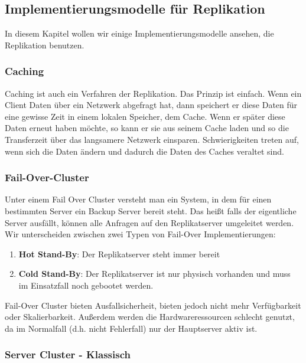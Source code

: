\subsection{Implementierungsmodelle für Replikation}
In diesem Kapitel wollen wir einige Implementierungsmodelle ansehen, die Replikation benutzen.

\subsubsection{Caching}
Caching ist auch ein Verfahren der Replikation. Das Prinzip ist einfach. Wenn ein Client Daten über ein Netzwerk abgefragt hat, dann speichert er diese Daten für eine gewisse Zeit in einem lokalen Speicher, dem Cache. Wenn er später diese Daten erneut haben möchte, so kann er sie aus seinem Cache laden und so die Transferzeit über das langsamere Netzwerk einsparen. Schwierigkeiten treten auf, wenn sich die Daten ändern und dadurch die Daten des Caches veraltet sind.

\subsubsection{Fail-Over-Cluster}
\label{sec:fail-over-cluster}

Unter einem Fail Over Cluster versteht man ein System, in dem für einen bestimmten Server ein Backup Server bereit steht. Das heißt falls der eigentliche Server ausfällt, können alle Anfragen auf den Replikatserver umgeleitet werden. Wir unterscheiden zwischen zwei Typen von Fail-Over Implementierungen:
\begin{enumerate}
    \item \textbf{Hot Stand-By}: Der Replikatserver steht immer bereit
    \item \textbf{Cold Stand-By}: Der Replikatserver ist nur physisch vorhanden und muss im Einsatzfall noch gebootet werden.
\end{enumerate}

Fail-Over Cluster bieten Ausfallsicherheit, bieten jedoch nicht mehr Verfügbarkeit oder Skalierbarkeit. Außerdem werden die Hardwareressourcen schlecht genutzt, da im Normalfall (d.h. nicht Fehlerfall) nur der Hauptserver aktiv ist.

\subsubsection{Server Cluster - Klassisch}
\label{sec:classic-server-cluster}

